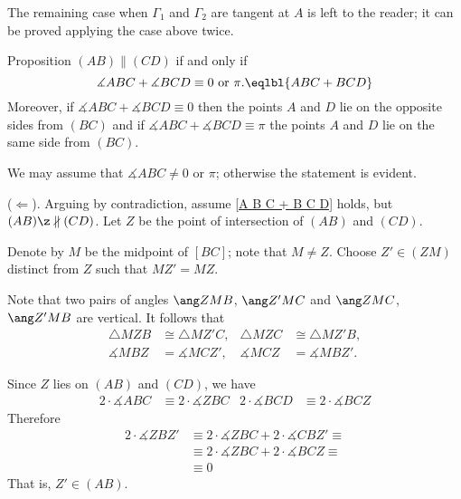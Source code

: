 The remaining case when $\Gamma_1$ and $\Gamma_2$ are tangent at $A$ is left to the reader;
it can be proved applying the case above twice.
\qeds













\begin{thm}{Proposition}\label{prop:parallel-2}
$(AB)\parallel(C D)$ if and only if 
$$\measuredangle A B C+\measuredangle B C D\equiv 0\ \text{or}\ \pi.\eqlbl{A B C + B C D}$$ 
Moreover, if $\measuredangle A B C+\measuredangle B C D\equiv 0$
then the points $A$ and $D$ lie on the opposite sides from $(BC)$ 
and if $\measuredangle A B C+\measuredangle B C D\equiv \pi$
 the points $A$ and $D$ lie on the same side from $(BC)$.
\end{thm}

We may assume that $\measuredangle ABC\ne 0$ or $\pi$;
otherwise the statement is evident. 

\parit{}($\Leftarrow$).
Arguing by contradiction, 
assume \ref{A B C + B C D} holds, but $(AB)\z\nparallel(C D)$.
Let $Z$ be the point of intersection of $(AB)$ and $(CD)$.

Denote by $M$ be the midpoint of $[BC]$; note that $M\ne Z$.
Choose $Z'\in (ZM)$ distinct from $Z$ such that $MZ'=MZ$.

Note that two pairs of angles 
$\ang ZMB$, $\ang Z'MC$
and
$\ang ZMC$, $\ang Z'MB$
are vertical.
It follows that
\begin{align*}
\triangle MZB&\cong \triangle MZ'C,
& 
\triangle MZC&\cong \triangle MZ'B,
\\
\measuredangle MBZ&=\measuredangle MCZ',
&
\measuredangle MCZ&=\measuredangle MBZ'.
\end{align*}

Since $Z$ lies on $(AB)$ and $(CD)$,
we have
\begin{align*}
2\cdot\measuredangle ABC&\equiv 2\cdot\measuredangle ZBC
&
2\cdot\measuredangle BCD &\equiv 2\cdot\measuredangle BCZ
\end{align*}
Therefore
\begin{align*}
2\cdot\measuredangle ZBZ'
&\equiv 2\cdot \measuredangle ZBC+2\cdot \measuredangle CBZ'\equiv
\\
&\equiv 2\cdot \measuredangle ZBC+2\cdot \measuredangle BCZ\equiv
\\
&\equiv 0
\end{align*}
That is, $Z'\in (AB)$.

